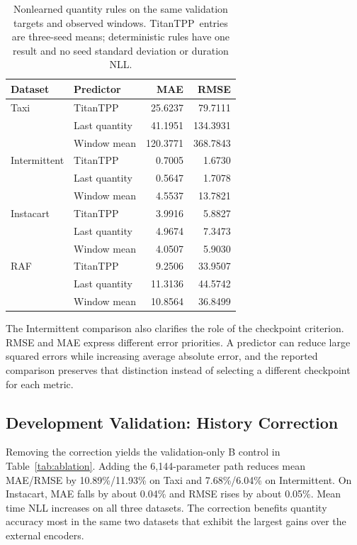 \documentclass[runningheads]{llncs}
\newcommand{\method}{TitanTPP}
\begin{document}
\begin{table}[t]
\caption{Nonlearned quantity rules on the same validation targets and
observed windows. \method\ entries are three-seed means; deterministic rules
have one result and no seed standard deviation or duration NLL.}
\label{tab:naive}\centering\small
\begin{tabular}{llrr}
\toprule
Dataset & Predictor & MAE & RMSE\\
\midrule
Taxi & TitanTPP & 25.6237 & 79.7111\\
 & Last quantity & 41.1951 & 134.3931\\
 & Window mean & 120.3771 & 368.7843\\
\midrule
Intermittent & TitanTPP & 0.7005 & 1.6730\\
 & Last quantity & 0.5647 & 1.7078\\
 & Window mean & 4.5537 & 13.7821\\
\midrule
Instacart & TitanTPP & 3.9916 & 5.8827\\
 & Last quantity & 4.9674 & 7.3473\\
 & Window mean & 4.0507 & 5.9030\\
\midrule
RAF & TitanTPP & 9.2506 & 33.9507\\
 & Last quantity & 11.3136 & 44.5742\\
 & Window mean & 10.8564 & 36.8499\\
\bottomrule
\end{tabular}
\end{table}

The Intermittent comparison also clarifies the role of the checkpoint
criterion. RMSE and MAE express different error priorities. A predictor can
reduce large squared errors while increasing average absolute error, and the
reported comparison preserves that distinction instead of selecting a
different checkpoint for each metric.

\subsection{Development Validation: History Correction}
Removing the correction yields the validation-only B control in Table~\ref{tab:ablation}.
Adding the 6,144-parameter path reduces mean MAE/RMSE by 10.89\%/11.93\% on
Taxi and 7.68\%/6.04\% on Intermittent. On Instacart, MAE falls by about
0.04\% and RMSE rises by about 0.05\%. Mean time NLL increases on all three
datasets. The correction benefits quantity accuracy most in the same two
datasets that exhibit the largest gains over the external encoders.
\end{document}
